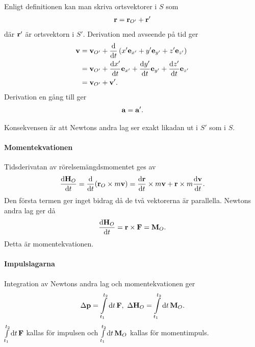 Enligt definitionen kan man skriva ortsvektorer i $S$ som
\begin{align*}
	\vb{r} = \vb{r}_{O'} + \vb{r}'
\end{align*}
där $\vb{r}'$ är ortsvektorn i $S'$. Derivation med avseende på tid ger
\begin{align*}
	\vb{v} &= \vb{v}_{O'} + \dv{t}\left(x'\vb{e}_{x'} + y'\vb{e}_{y'} + z'\vb{e}_{z'}\right) \\
	       &= \vb{v}_{O'} + \dv{x'}{t}\vb{e}_{x'} + \dv{y'}{t}\vb{e}_{y'} + \dv{z'}{t}\vb{e}_{z'} \\
	       &= \vb{v}_{O'} + \vb{v}'.
\end{align*}
Derivation en gång till ger
\begin{align*}
	\vb{a} = \vb{a}'.
\end{align*}

Konsekvensen är att Newtons andra lag ser exakt likadan ut i $S'$ som i $S$.

\paragraph{Momentekvationen}
Tidsderivatan av rörelsemängdsmomentet ges av
\begin{align*}
	\dv{\vb{H}_{O}}{t} = \dv{t}(\vb{r}_{O}\times m\vb{v}) = \dv{\vb{r}}{t}\times m\vb{v} + \vb{r}\times m\dv{\vb{v}}{t}.
\end{align*}
Den första termen ger inget bidrag då de två vektorerna är parallella. Newtons andra lag ger då
\begin{align*}
	\dv{\vb{H}_{O}}{t} = \vb{r}\times\vb{F} = \vb{M}_{O}.
\end{align*}
Detta är momentekvationen.

\paragraph{Impulslagarna}
Integration av Newtons andra lag och momentekvationen ger
\begin{align*}
	\Delta\vb{p} = \int\limits_{t_1}^{t_2}\dd{t}\vb{F},\ \Delta\vb{H}_{O} = \int\limits_{t_1}^{t_2}\dd{t}\vb{M}_{O}.
\end{align*}
$\int\limits_{t_1}^{t_2}\dd{t}\vb{F}$ kallas för impulsen och $\int\limits_{t_1}^{t_2}\dd{t}\vb{M}_{O}$ kallas för momentimpuls.